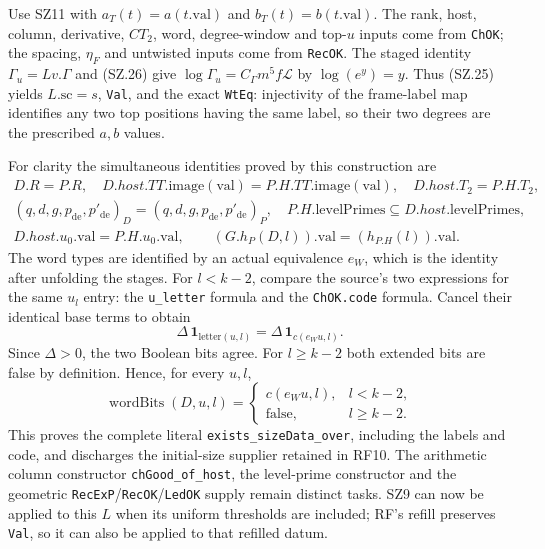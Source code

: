 \documentclass[11pt,a4paper]{article}
\numberwithin{equation}{section}
\theoremstyle{remark}\newtheorem{remark}[theorem]{Remark}
\begin{document}
Use SZ11 with $a_T(t)=a(t.\mathrm{val})$ and
$b_T(t)=b(t.\mathrm{val})$. The rank, host, column, derivative,
$CT_2$, word, degree-window and top-$u$ inputs come from
\texttt{ChOK}; the spacing, $\eta_F$ and untwisted inputs come
from \texttt{RecOK}. The staged identity
$\Gamma_u=Lv.\Gamma$ and (SZ.26) give
$\log\Gamma_u=C_\Gamma m^5f\mathcal L$ by $\log(e^y)=y$.
Thus (SZ.25) yields $L.\mathrm{sc}=s$,
\texttt{Val}, and the exact \texttt{WtEq}: injectivity of the
frame-label map identifies any two top positions having the same
label, so their two degrees are the prescribed $a,b$ values.

For clarity the simultaneous identities proved by this construction
are
\[
 \begin{gathered}
 D.R=P.R,\quad
 D.host.TT.\mathrm{image}(\mathrm{val})
          =P.H.TT.\mathrm{image}(\mathrm{val}),\quad
 D.host.T_2=P.H.T_2,\\
 (q,d,g,p_{\mathrm{de}},p'_{\mathrm{de}})_D
          =(q,d,g,p_{\mathrm{de}},p'_{\mathrm{de}})_P,\quad
 P.H.\mathrm{levelPrimes}\subseteq D.host.\mathrm{levelPrimes},\\
 D.host.u_0.\mathrm{val}=P.H.u_0.\mathrm{val},\qquad
 (G.h_P(D,l)).\mathrm{val}=(h_{P.H}(l)).\mathrm{val}.
 \end{gathered}                                                    \tag{SZ.27}
\]
The word types are identified by an actual equivalence $e_W$, which
is the identity after unfolding the stages. For $l<k-2$, compare
the source's two expressions for the same $u_l$ entry: the
\texttt{u\_\allowbreak letter} formula and the \texttt{ChOK.code} formula.
Cancel their identical base terms to obtain
\[
 \Delta\,\mathbf1_{\mathrm{letter}(u,l)}
             =\Delta\,\mathbf1_{c(e_Wu,l)}.
\]
Since $\Delta>0$, the two Boolean bits agree. For $l\geq k-2$
both extended bits are false by definition. Hence, for every $u,l$,
\[
 \operatorname{wordBits}(D,u,l)=
 \begin{cases}c(e_Wu,l),&l<k-2,\\ \mathrm{false},&l\geq k-2.
 \end{cases}                                                      \tag{SZ.28}
\]
This proves the complete literal \texttt{exists\_\allowbreak sizeData\_\allowbreak over},
including the labels and code, and discharges the initial-size
supplier retained in RF10. The arithmetic column constructor
\texttt{chGood\_\allowbreak of\_\allowbreak host}, the level-prime constructor and the
geometric \texttt{RecExP}/\texttt{RecOK}/\texttt{LedOK} supply
remain distinct tasks. SZ9 can now be applied to this $L$ when its
uniform thresholds are included; RF's refill preserves
\texttt{Val}, so it can also be applied to that refilled datum.
\end{document}
